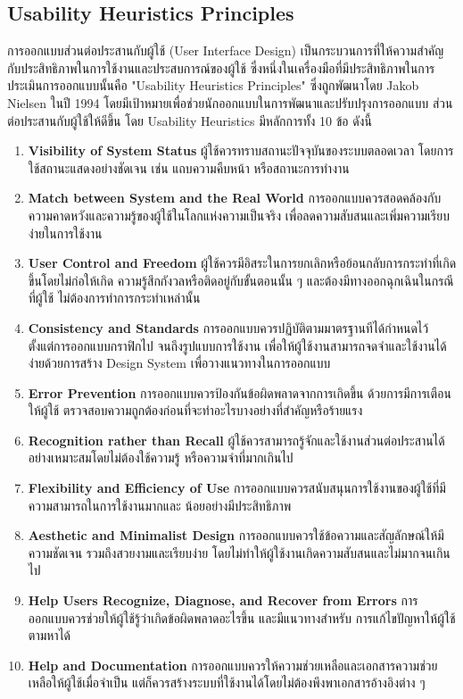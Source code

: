\subsection{Usability Heuristics Principles}
การออกแบบส่วนต่อประสานกับผู้ใช้ (User Interface Design)
เป็นกระบวนการที่ให้ความสำคัญกับประสิทธิภาพในการใช้งานและประสบการณ์ของผู้ใช้
ซึ่งหนึ่งในเครื่องมือที่มีประสิทธิภาพในการประเมินการออกแบบนั้นคือ
"Usability Heuristics Principles"\cite{10UH} ซึ่งถูกพัฒนาโดย Jakob Nielsen
ในปี 1994 โดยมีเป้าหมายเพื่อช่วยนักออกแบบในการพัฒนาและปรับปรุงการออกแบบ
ส่วนต่อประสานกับผู้ใช้ให้ดีขึ้น โดย Usability Heuristics มีหลักการทั้ง 10 ข้อ ดังนี้
\begin{enumerate}
      \item \textbf{Visibility of System Status}
            ผู้ใช้ควรทราบสถานะปัจจุบันของระบบตลอดเวลา โดยการใช้สถานะแสดงอย่างชัดเจน
            เช่น แถบความคืบหน้า หรือสถานะการทำงาน
      \item \textbf{Match between System and the Real World}
            การออกแบบควรสอดคล้องกับความคาดหวังและความรู้ของผู้ใช้ในโลกแห่งความเป็นจริง
            เพื่อลดความสับสนและเพิ่มความเรียบง่ายในการใช้งาน
      \item \textbf{User Control and Freedom}
            ผู้ใช้ควรมีอิสระในการยกเลิกหรือย้อนกลับการกระทำที่เกิดขึ้นโดยไม่ก่อให้เกิด
            ความรู้สึกกังวลหรือติดอยู่กับขั้นตอนนั้น ๆ  และต้องมีทางออกฉุกเฉินในกรณีที่ผู้ใช้
            ไม่ต้องการทำการกระทำเหล่านั้น
      \item \textbf{Consistency and Standards}
            การออกแบบควรปฏิบัติตามมาตรฐานทีได้กำหนดไว้ ตั้งแต่การออกแบบกราฟิกไป
            จนถึงรูปแบบการใช้งาน เพื่อให้ผู้ใช้งานสามารถจดจำและใช้งานได้ง่ายด้วยการสร้าง
            Design System เพื่อวางแนวทางในการออกแบบ
      \item \textbf{Error Prevention}
            การออกแบบควรป้องกันข้อผิดพลาดจากการเกิดขึ้น ด้วยการมีการเตือนให้ผู้ใช้
            ตรวจสอบความถูกต้องก่อนที่จะทำอะไรบางอย่างที่สำคัญหรือร้ายแรง
      \item \textbf{Recognition rather than Recall}
            ผู้ใช้ควรสามารถรู้จักและใช้งานส่วนต่อประสานได้อย่างเหมาะสมโดยไม่ต้องใช้ความรู้
            หรือความจำที่มากเกินไป
      \item \textbf{Flexibility and Efficiency of Use}
            การออกแบบควรสนับสนุนการใช้งานของผู้ใช้ที่มีความสามารถในการใช้งานมากและ
            น้อยอย่างมีประสิทธิภาพ
      \item \textbf{Aesthetic and Minimalist Design}
            การออกแบบควรใช้ข้อความและสัญลักษณ์ให้มีความชัดเจน รวมถึงสวยงามและเรียบง่าย
            โดยไม่ทำให้ผู้ใช้งานเกิดความสับสนและไม่มากจนเกินไป
      \item \textbf{Help Users Recognize, Diagnose, and Recover from Errors}
            การออกแบบควรช่วยให้ผู้ใช้รู้ว่าเกิดข้อผิดพลาดอะไรขึ้น และมีแนวทางสำหรับ
            การแก้ไขปัญหาให้ผู้ใช้ตามหาได้
      \item \textbf{Help and Documentation}
            การออกแบบควรให้ความช่วยเหลือและเอกสารความช่วยเหลือให้ผู้ใช้เมื่อจำเป็น
            แต่ก็ควรสร้างระบบที่ใช้งานได้โดยไม่ต้องพึงพาเอกสารอ้างอิงต่าง ๆ
\end{enumerate}

